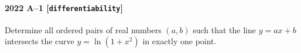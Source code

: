 \paragraph{2022 A--1 \textnormal{[\texttt{differentiability}]}}
Determine all ordered pairs of real numbers $(a,b)$ such that the line $y = ax+b$ intersects the curve $y = \ln(1+x^2)$ in exactly one point.

